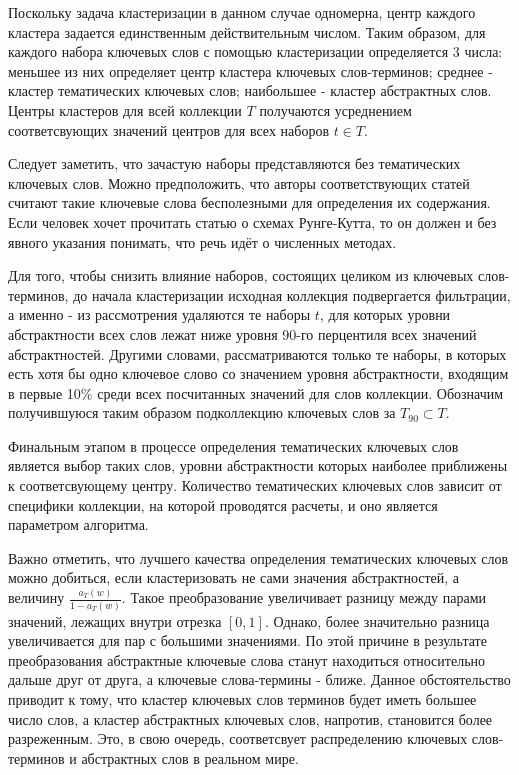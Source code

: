 Поскольку задача кластеризации в данном случае одномерна, центр каждого кластера задается единственным действительным числом. Таким образом, для каждого набора ключевых слов с помощью кластеризации определяется 3 числа: меньшее из них определяет центр кластера ключевых слов-терминов; среднее - кластер тематических ключевых слов; наибольшее - кластер абстрактных слов. Центры кластеров для всей коллекции $T$ получаются усреднением соответсвующих значений центров для всех наборов $t \in T$.

Следует заметить, что зачастую наборы представляются без тематических ключевых слов. Можно предположить, что авторы соответствующих статей считают такие ключевые слова бесполезными для определения их содержания. Если человек хочет прочитать статью о схемах Рунге-Кутта, то он должен и без явного указания понимать, что речь идёт о численных методах.

Для того, чтобы снизить влияние наборов, состоящих целиком из ключевых слов-терминов, до начала кластеризации исходная коллекция подвергается фильтрации, а именно - из рассмотрения удаляются те наборы $t$, для которых уровни абстрактности всех слов лежат ниже уровня 90-го перцентиля всех значений абстрактностей. Другими словами, рассматриваются только те наборы, в которых есть хотя бы одно ключевое слово со значением уровня абстрактности, входящим в первые 10\% среди всех посчитанных значений для слов коллекции. Обозначим получившуюся таким образом подколлекцию ключевых слов за $T_{90} \subset T$. 

Финальным этапом в процессе определения тематических ключевых слов является выбор таких слов, уровни абстрактности которых наиболее приближены к соответсвующему центру. Количество тематических ключевых слов зависит от специфики коллекции, на которой проводятся расчеты, и оно является параметром алгоритма.

Важно отметить, что лучшего качества определения тематических ключевых слов можно добиться, если кластеризовать не сами значения абстрактностей, а величину $\frac{a_T(w)}{1 - a_T(w)}$. Такое преобразование увеличивает разницу между парами значений, лежащих внутри отрезка $[0, 1]$. Однако,  более значительно разница увеличивается для пар с большими значениями. По этой причине в результате преобразования абстрактные ключевые слова станут находиться относительно дальше друг от друга, а ключевые слова-термины - ближе. Данное обстоятельство приводит к тому, что кластер ключевых слов терминов будет иметь большее число слов, а кластер абстрактных ключевых слов, напротив, становится более разреженным. Это, в свою очередь, соответсвует распределению ключевых слов-терминов и абстрактных слов в реальном мире.

